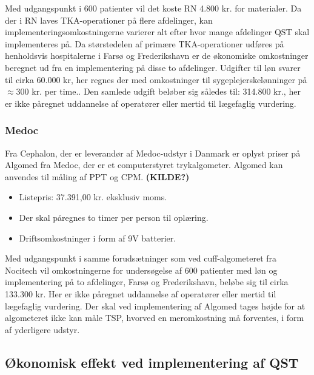 Med udgangspunkt i 600 patienter vil det koste RN 4.800 kr. for materialer. Da der i RN laves TKA-operationer på flere afdelinger, kan implementeringsomkostningerne varierer alt efter hvor mange afdelinger QST skal implementeres på. Da størstedelen af primære TKA-operationer udføres på henholdsvis hospitalerne i Farsø og Frederikshavn er de økonomiske omkostninger beregnet ud fra en implementering på disse to afdelinger. Udgifter til løn svarer til cirka 60.000 kr, her regnes der med omkostninger til sygeplejerskelønninger på $\approx 300$ kr. per time.\citep{DST1}\citep{DST2}. Den samlede udgift beløber sig således til: 314.800 kr., her er ikke påregnet uddannelse af operatører eller mertid til lægefaglig vurdering.


\subsubsection{Medoc}
Fra Cephalon, der er leverandør af Medoc-udstyr i Danmark er oplyst priser på Algomed fra Medoc, der er et computerstyret trykalgometer. Algomed kan anvendes til måling af PPT og CPM. \textbf{(KILDE?)}




\begin{itemize}  
\item Listepris: 37.391,00 kr. eksklusiv moms.
\item Der skal påregnes to timer per person til oplæring.
\item Driftsomkostninger i form af 9V batterier.
\end{itemize}


Med udgangspunkt i samme forudsætninger som ved cuff-algometeret fra Nocitech vil omkostningerne for undersøgelse af 600 patienter med løn og implementering på to afdelinger, Farsø og Frederikshavn, beløbe sig til cirka 133.300 kr. Her er ikke påregnet uddannelse af operatører eller mertid til lægefaglig vurdering. Der skal ved implementering af Algomed tages højde for at algometeret  ikke kan måle TSP, hvorved en meromkostning må forventes, i form af yderligere udstyr.


\subsection{Økonomisk effekt ved implementering af QST}


